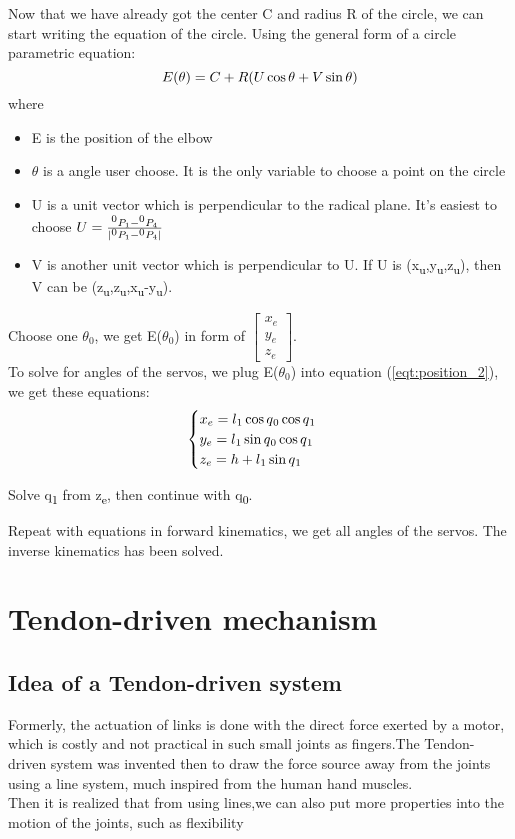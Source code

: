 \documentclass[conference]{IEEEtran}
\def\SP#1{\textsuperscript{\textcolor{black}{#1}}}
\def\SB#1{\textsubscript{\textcolor{black}{#1}}}
\begin{document}
  Now that we have already got the center C and radius R of the circle, we can start writing the equation of the circle. Using the general form of a circle parametric equation:
  \begin{equation} \label{eqt:circur_parametric}
  \centering
  E(\theta) = C + R(U\cos{\theta} + V\sin{\theta})
  \end{equation}
  where
  \begin{itemize}
  	\item E is the position of the elbow
  	\item $\theta$ is a angle user choose. It is the only variable to choose a point on the circle
  	\item U is a unit vector which is perpendicular to the radical plane. It's easiest to choose $U = \frac{\SP{0}P_1 - \SP{0}P_4}{|\SP{0}P_1 - \SP{0}P_4|}$
  	\item V is another unit vector which is perpendicular to U. If U is (x\SB{u},y\SB{u},z\SB{u}), then V can be (z\SB{u},z\SB{u},x\SB{u}-y\SB{u}).
  \end{itemize}
  Choose one $\theta_0$, we get E($\theta_0$) in form of $\begin{bmatrix}
  x_e\\
  y_e\\
  z_e
  \end{bmatrix}$.\\
  To solve for angles of the servos, we plug E($\theta_0$) into equation (\ref{eqt:position_2}), we get these equations:
  \[
  \begin{cases}
  x_e = l\SB{1}\cos{q\SB{0}}\cos{q\SB{1}}\\
  y_e = l\SB{1}\sin{q\SB{0}}\cos{q\SB{1}}\\
  z_e = h + l\SB{1}\sin{q\SB{1}}
  \end{cases}
  \]
  
  Solve q\SB{1} from z\SB{e}, then continue with q\SB{0}.
  
  Repeat with equations in forward kinematics, we get all angles of the servos. The inverse kinematics has been solved.


\section{Tendon-driven mechanism}
\subsection{Idea of a Tendon-driven system}
Formerly, the actuation of links is done with the direct force exerted by a motor, which is costly and not practical in such small joints as fingers.The Tendon-driven system was invented then to draw the force source away from the joints using a line system, much inspired from the human hand muscles.\\
Then it is realized that from using lines,we can also put more properties into the motion of the joints, such as flexibility
\end{document}
